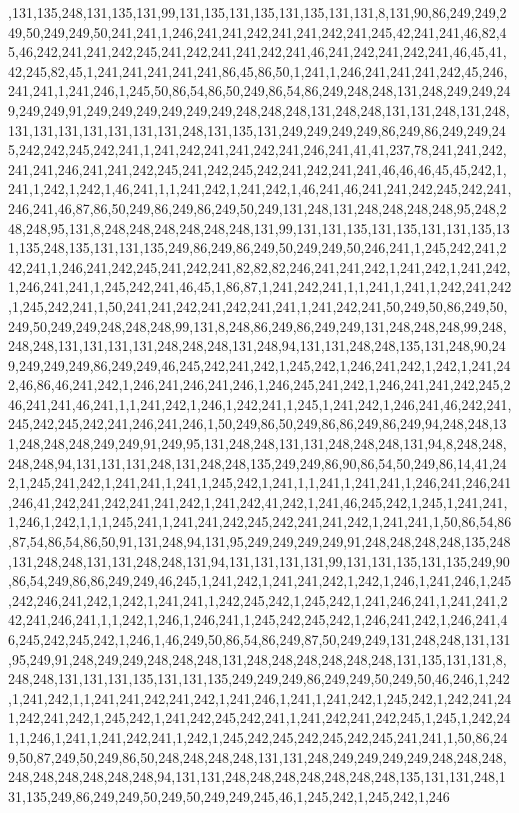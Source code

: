 ,131,135,248,131,135,131,99,131,135,131,135,131,135,131,131,8,131,90,86,249,249,249,50,249,249,50,241,241,1,246,241,241,242,241,241,242,241,245,42,241,241,46,82,45,46,242,241,241,242,245,241,242,241,241,242,241,46,241,242,241,242,241,46,45,41,42,245,82,45,1,241,241,241,241,241,86,45,86,50,1,241,1,246,241,241,241,242,45,246,241,241,1,241,246,1,245,50,86,54,86,50,249,86,54,86,249,248,248,131,248,249,249,249,249,249,91,249,249,249,249,249,249,248,248,248,131,248,248,131,131,248,131,248,131,131,131,131,131,131,131,248,131,135,131,249,249,249,249,86,249,86,249,249,245,242,242,245,242,241,1,241,242,241,241,242,241,246,241,41,41,237,78,241,241,242,241,241,246,241,241,242,245,241,242,245,242,241,242,241,241,46,46,46,45,45,242,1,241,1,242,1,242,1,46,241,1,1,241,242,1,241,242,1,46,241,46,241,241,242,245,242,241,246,241,46,87,86,50,249,86,249,86,249,50,249,131,248,131,248,248,248,248,95,248,248,248,95,131,8,248,248,248,248,248,248,131,99,131,131,135,131,135,131,131,135,131,135,248,135,131,131,135,249,86,249,86,249,50,249,249,50,246,241,1,245,242,241,242,241,1,246,241,242,245,241,242,241,82,82,82,246,241,241,242,1,241,242,1,241,242,1,246,241,241,1,245,242,241,46,45,1,86,87,1,241,242,241,1,1,241,1,241,1,242,241,242,1,245,242,241,1,50,241,241,242,241,242,241,241,1,241,242,241,50,249,50,86,249,50,249,50,249,249,248,248,248,99,131,8,248,86,249,86,249,249,131,248,248,248,99,248,248,248,131,131,131,131,248,248,248,131,248,94,131,131,248,248,135,131,248,90,249,249,249,249,86,249,249,46,245,242,241,242,1,245,242,1,246,241,242,1,242,1,241,242,46,86,46,241,242,1,246,241,246,241,246,1,246,245,241,242,1,246,241,241,242,245,246,241,241,46,241,1,1,241,242,1,246,1,242,241,1,245,1,241,242,1,246,241,46,242,241,245,242,245,242,241,246,241,246,1,50,249,86,50,249,86,86,249,86,249,94,248,248,131,248,248,248,249,249,91,249,95,131,248,248,131,131,248,248,248,131,94,8,248,248,248,248,94,131,131,131,248,131,248,248,135,249,249,86,90,86,54,50,249,86,14,41,242,1,245,241,242,1,241,241,1,241,1,245,242,1,241,1,1,241,1,241,241,1,246,241,246,241,246,41,242,241,242,241,241,242,1,241,242,41,242,1,241,46,245,242,1,245,1,241,241,1,246,1,242,1,1,1,245,241,1,241,241,242,245,242,241,241,242,1,241,241,1,50,86,54,86,87,54,86,54,86,50,91,131,248,94,131,95,249,249,249,249,91,248,248,248,248,135,248,131,248,248,131,131,248,248,131,94,131,131,131,131,99,131,131,135,131,135,249,90,86,54,249,86,86,249,249,46,245,1,241,242,1,241,241,242,1,242,1,246,1,241,246,1,245,242,246,241,242,1,242,1,241,241,1,242,245,242,1,245,242,1,241,246,241,1,241,241,242,241,246,241,1,1,242,1,246,1,246,241,1,245,242,245,242,1,246,241,242,1,246,241,46,245,242,245,242,1,246,1,46,249,50,86,54,86,249,87,50,249,249,131,248,248,131,131,95,249,91,248,249,249,248,248,248,131,248,248,248,248,248,248,131,135,131,131,8,248,248,131,131,131,135,131,131,135,249,249,249,86,249,249,50,249,50,46,246,1,242,1,241,242,1,1,241,241,242,241,242,1,241,246,1,241,1,241,242,1,245,242,1,242,241,241,242,241,242,1,245,242,1,241,242,245,242,241,1,241,242,241,242,245,1,245,1,242,241,1,246,1,241,1,241,242,241,1,242,1,245,242,245,242,245,242,245,241,241,1,50,86,249,50,87,249,50,249,86,50,248,248,248,248,131,131,248,249,249,249,249,248,248,248,248,248,248,248,248,248,94,131,131,248,248,248,248,248,248,248,135,131,131,248,131,135,249,86,249,249,50,249,50,249,249,245,46,1,245,242,1,245,242,1,246